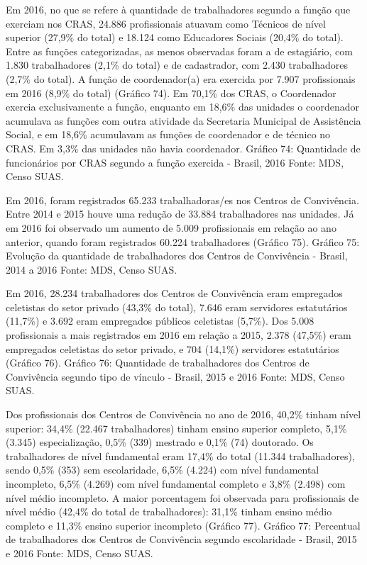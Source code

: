 \documentclass[
  brazilian]{report}
\begin{document}
Em 2016, no que se refere à quantidade de trabalhadores segundo a função
que exerciam nos CRAS, 24.886 profissionais atuavam como Técnicos de
nível superior (27,9\% do total) e 18.124 como Educadores Sociais
(20,4\% do total). Entre as funções categorizadas, as menos observadas
foram a de estagiário, com 1.830 trabalhadores (2,1\% do total) e de
cadastrador, com 2.430 trabalhadores (2,7\% do total). A função de
coordenador(a) era exercida por 7.907 profissionais em 2016 (8,9\% do
total) (Gráfico 74). Em 70,1\% dos CRAS, o Coordenador exercia
exclusivamente a função, enquanto em 18,6\% das unidades o coordenador
acumulava as funções com outra atividade da Secretaria Municipal de
Assistência Social, e em 18,6\% acumulavam as funções de coordenador e
de técnico no CRAS. Em 3,3\% das unidades não havia coordenador. Gráfico
74: Quantidade de funcionários por CRAS segundo a função exercida -
Brasil, 2016 Fonte: MDS, Censo SUAS.

Em 2016, foram registrados 65.233 trabalhadoras/es nos Centros de
Convivência. Entre 2014 e 2015 houve uma redução de 33.884 trabalhadores
nas unidades. Já em 2016 foi observado um aumento de 5.009 profissionais
em relação ao ano anterior, quando foram registrados 60.224
trabalhadores (Gráfico 75). Gráfico 75: Evolução da quantidade de
trabalhadores dos Centros de Convivência - Brasil, 2014 a 2016 Fonte:
MDS, Censo SUAS.

Em 2016, 28.234 trabalhadores dos Centros de Convivência eram empregados
celetistas do setor privado (43,3\% do total), 7.646 eram servidores
estatutários (11,7\%) e 3.692 eram empregados públicos celetistas
(5,7\%). Dos 5.008 profissionais a mais registrados em 2016 em relação a
2015, 2.378 (47,5\%) eram empregados celetistas do setor privado, e 704
(14,1\%) servidores estatutários (Gráfico 76). Gráfico 76: Quantidade de
trabalhadores dos Centros de Convivência segundo tipo de vínculo -
Brasil, 2015 e 2016 Fonte: MDS, Censo SUAS.

Dos profissionais dos Centros de Convivência no ano de 2016, 40,2\%
tinham nível superior: 34,4\% (22.467 trabalhadores) tinham ensino
superior completo, 5,1\% (3.345) especialização, 0,5\% (339) mestrado e
0,1\% (74) doutorado. Os trabalhadores de nível fundamental eram 17,4\%
do total (11.344 trabalhadores), sendo 0,5\% (353) sem escolaridade,
6,5\% (4.224) com nível fundamental incompleto, 6,5\% (4.269) com nível
fundamental completo e 3,8\% (2.498) com nível médio incompleto. A maior
porcentagem foi observada para profissionais de nível médio (42,4\% do
total de trabalhadores): 31,1\% tinham ensino médio completo e 11,3\%
ensino superior incompleto (Gráfico 77). Gráfico 77: Percentual de
trabalhadores dos Centros de Convivência segundo escolaridade - Brasil,
2015 e 2016 Fonte: MDS, Censo SUAS.
\end{document}
